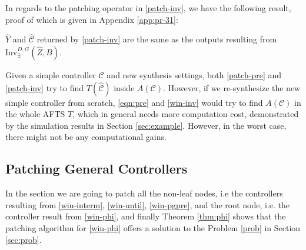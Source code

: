 In regards to the patching operator in \eqref{patch-inv}, we have the following result, proof of which is given in Appendix \ref{app:pr-31}:

\begin{theorem}
	$ \widehat{Y} $ and $ \widehat{\mathcal{C}} $ returned by \eqref{patch-inv} are the same as the outputs resulting from $ \text{Inv}_{\exists}^{D,G}(\widehat{Z},B) $.	\label{thm:inv}
\end{theorem}
Given a simple controller $ \mathcal{C} $ and new synthesis settings, both \eqref{patch-pre} and \eqref{patch-inv} try to find $ T(\widehat{\mathcal{C}}) $ inside $ A(\mathcal{C}) $. However, if we re-synthesize the new simple controller from scratch, \eqref{eqn:pre} and \eqref{win-inv} would try to find $ A(\mathcal{C}) $ in the whole AFTS $ T $, which in general needs more computation cost, demonstrated by the simulation results in Section \ref{sec:example}. However, in the worst case, there might not be any computational gains.

\subsection{Patching General Controllers}
\label{sec:patch-cont}

In the section we are going to patch all the non-leaf nodes, i.e  the controllers resulting from \eqref{win-interm}, \eqref{win-until}, \eqref{win-pgpre}, and the root node, i.e. the controller result from \eqref{win-phi}, and finally Theorem \ref{thm:phi} shows that the patching algorithm for \eqref{win-phi} offers a solution to the Problem \ref{prob} in Section \ref{sec:prob}.



